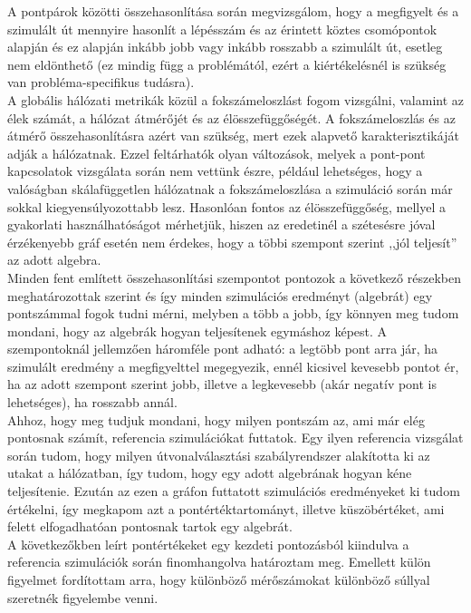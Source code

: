     A pontpárok közötti összehasonlítása során megvizsgálom, hogy a megfigyelt és a szimulált út mennyire hasonlít a lépésszám és az érintett köztes csomópontok alapján és ez alapján inkább jobb vagy inkább rosszabb a szimulált út, esetleg nem eldönthető (ez mindig függ a problémától, ezért a kiértékelésnél is szükség van probléma-specifikus tudásra).\\

    A globális hálózati metrikák közül a fokszámeloszlást fogom vizsgálni, valamint az élek számát, a hálózat átmérőjét és az élösszefüggőségét. A fokszámeloszlás és az átmérő összehasonlításra azért van szükség, mert ezek alapvető karakterisztikáját adják a hálózatnak. Ezzel feltárhatók olyan változások, melyek a pont-pont kapcsolatok vizsgálata során nem vettünk észre, például lehetséges, hogy a valóságban skálafüggetlen hálózatnak a fokszámeloszlása a szimuláció során már sokkal kiegyensúlyozottabb lesz. Hasonlóan fontos az élösszefüggőség, mellyel a gyakorlati használhatóságot mérhetjük, hiszen az eredetinél a szétesésre jóval érzékenyebb gráf esetén nem érdekes, hogy a többi szempont szerint ,,jól teljesít'' az adott algebra.\\

    Minden fent említett összehasonlítási szempontot pontozok a következő részekben meghatározottak szerint és így minden szimulációs eredményt (algebrát) egy pontszámmal fogok tudni mérni, melyben a több a jobb, így könnyen meg tudom mondani, hogy az algebrák hogyan teljesítenek egymáshoz képest. A szempontoknál jellemzően háromféle pont adható: a legtöbb pont arra jár, ha szimulált eredmény a megfigyelttel megegyezik, ennél kicsivel kevesebb pontot ér, ha az adott szempont szerint jobb, illetve a legkevesebb (akár negatív pont is lehetséges), ha rosszabb annál.\\

    Ahhoz, hogy meg tudjuk mondani, hogy milyen pontszám az, ami már elég pontosnak számít, referencia szimulációkat futtatok. Egy ilyen referencia vizsgálat során tudom, hogy milyen útvonalválasztási szabályrendszer alakította ki az utakat a hálózatban, így tudom, hogy egy adott algebrának hogyan kéne teljesítenie. Ezután az ezen a gráfon futtatott szimulációs eredményeket ki tudom értékelni, így megkapom azt a pontértéktartományt, illetve küszöbértéket, ami felett elfogadhatóan pontosnak tartok egy algebrát.\\
    A következőkben leírt pontértékeket egy kezdeti pontozásból kiindulva a referencia szimulációk során finomhangolva határoztam meg. Emellett külön figyelmet fordítottam arra, hogy különböző mérőszámokat különböző súllyal szeretnék figyelembe venni.

